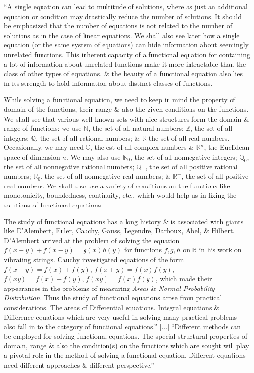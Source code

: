 \documentclass{article}
\numberwithin{equation}{section}
\begin{document}
``A single equation can lead to multitude of solutions, where as just an additional equation or condition may drastically reduce the number of solutions. It should be emphasized that the number of equations is not related to the number of solutions as in the case of linear equations. We shall also see later how a single equation (or the same system of equations) can hide information about seemingly unrelated functions. This inherent capacity of a functional equation for containing a lot of information about unrelated functions make it more intractable than the class of other types of equations. \& the beauty of a functional equation also lies in its strength to hold information about distinct classes of functions.

While solving a functional equation, we need to keep in mind the property of domain of the functions, their range \& also the given conditions on the functions. We shall see that various well known sets with nice structures form the domain \& range of functions: we use $\mathbb{N}$, the set of all natural numbers; $\mathbb{Z}$, the set of all integers; $\mathbb{Q}$, the set of all rational numbers; \& $\mathbb{R}$ the set of all real numbers. Occasionally, we may need $\mathbb{C}$, the est of all complex numbers \& $\mathbb{R}^n$, the Euclidean space of dimension $n$. We may also use $\mathbb{N}_0$, the set of all nonnegative integers; $\mathbb{Q}_0$, the set of all nonnegative rational numbers; $\mathbb{Q}^+$, the set of all positive rational numbers; $\mathbb{R}_0$, the set of all nonnegative real numbers; \& $\mathbb{R}^+$, the set of all positive real numbers. We shall also use a variety of conditions on the functions like monotonicity, boundedness, continuity, etc., which would help us in fixing the solutions of functional equations.

The study of functional equations has a long history \& is associated with giants like D'Alembert, Euler, Cauchy, Gauss, Legendre, Darboux, Abel, \& Hilbert. D'Alembert arrived at the problem of solving the equation $f(x + y) + f(x - y) = g(x)h(y)$ for functions $f,g,h$ on $\mathbb{R}$ in his work on vibrating strings. Cauchy investigated equations of the form $f(x + y) = f(x) + f(y)$, $f(x + y) = f(x)f(y)$, $f(xy) = f(x) + f(y)$, $f(xy) = f(x)f(y)$, which made their appearances in the problems of measuring \textit{Areas} \& \textit{Normal Probability Distribution}. Thus the study of functional equations arose from practical considerations. The areas of Differential equations, Integral equations \& Difference equations which are very useful in solving many practical problems also fall in to the category of functional equations.'' [$\ldots$] ``Different methods can be employed for solving functional equations. The special structural properties of domain, range \& also the condition(s) on the functions which are sought will play a pivotal role in the method of solving a functional equation. Different equations need different approaches \& different perspective.'' -- \cite[pp. 3--4]{Venkatachala2013}
\end{document}
